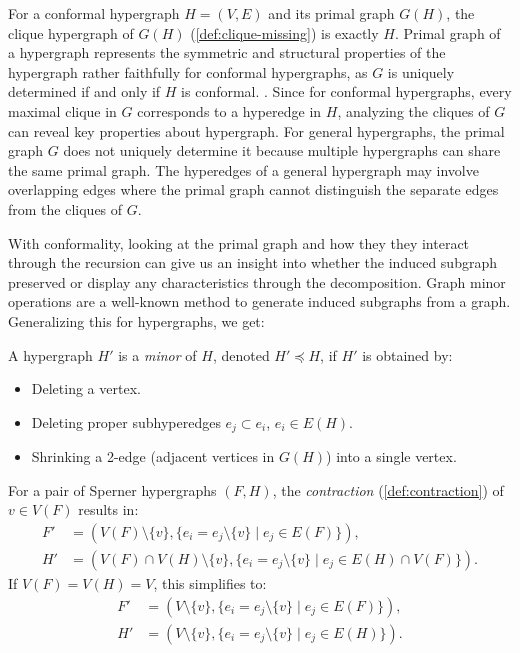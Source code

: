 For a conformal hypergraph $H=(V,E)$ and its primal graph $G(H)$, the clique hypergraph of $G(H)$ (\ref{def:clique-missing}) is exactly $H$. Primal graph of a hypergraph represents the symmetric and structural properties of the hypergraph rather faithfully for conformal hypergraphs, as $G$ is uniquely determined if and only if $H$ is conformal. \cite{GMR06}. Since for conformal hypergraphs, every maximal clique in $G$ corresponds to a hyperedge in $H$, analyzing the cliques of $G$ can reveal key properties about hypergraph. For general hypergraphs, the primal graph $G$ does not uniquely determine it because multiple hypergraphs can share the same primal graph. The hyperedges of a general hypergraph may involve overlapping edges where the primal graph cannot distinguish the separate edges from the cliques of $G$.

With conformality, looking at the primal graph and how they they interact through the \FKA{} recursion can give us an insight into whether the induced subgraph preserved or display any characteristics through the decomposition. Graph minor operations are a well-known method to generate induced subgraphs from a graph. Generalizing this for hypergraphs, we get:

A hypergraph $H'$ is a \emph{minor} of $H$, denoted $H'\preceq H$, if $H'$ is obtained by:
\begin{itemize}
\item Deleting a vertex.
\item Deleting proper subhyperedges $e_j\subset e_i$, $e_i\in E(H)$.
\item Shrinking a 2-edge (adjacent vertices in $G(H)$) into a single vertex.
\end{itemize}

For a pair of Sperner hypergraphs $(F,H)$, the \emph{contraction} (\ref{def:contraction}) of $v\in V(F)$ results in:
\begin{align*}
F'&=\left(V(F)\setminus\{v\},\{e_i=e_j\setminus\{v\}\mid e_j\in E(F)\}\right),\\
H'&=\left(V(F)\cap V(H)\setminus\{v\},\{e_i=e_j\setminus\{v\}\mid e_j\in E(H)\cap V(F)\}\right).
\end{align*}
If $V(F)=V(H)=V$, this simplifies to:
\begin{align*}
F'&=\left(V\setminus\{v\},\{e_i=e_j\setminus\{v\}\mid e_j\in E(F)\}\right),\\
H'&=\left(V\setminus\{v\},\{e_i=e_j\setminus\{v\}\mid e_j\in E(H)\}\right).
\end{align*}

